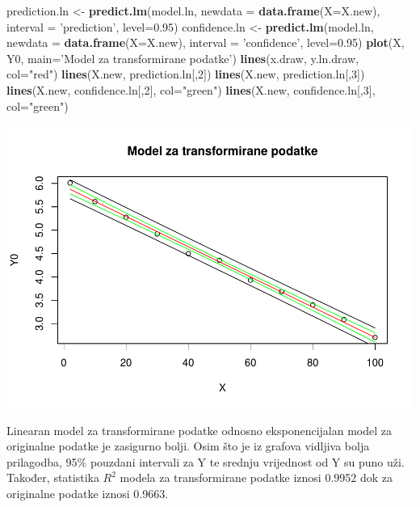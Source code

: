 \documentclass[]{article}
\newenvironment{Shaded}{\begin{snugshade}}{\end{snugshade}}
\newcommand{\KeywordTok}[1]{\textcolor[rgb]{0.13,0.29,0.53}{\textbf{{#1}}}}
\newcommand{\DataTypeTok}[1]{\textcolor[rgb]{0.13,0.29,0.53}{{#1}}}
\newcommand{\DecValTok}[1]{\textcolor[rgb]{0.00,0.00,0.81}{{#1}}}
\newcommand{\FloatTok}[1]{\textcolor[rgb]{0.00,0.00,0.81}{{#1}}}
\newcommand{\StringTok}[1]{\textcolor[rgb]{0.31,0.60,0.02}{{#1}}}
\newcommand{\NormalTok}[1]{{#1}}
\begin{document}
\begin{Shaded}
\begin{Highlighting}[]
\NormalTok{prediction.ln <-}\StringTok{ }\KeywordTok{predict.lm}\NormalTok{(model.ln, }\DataTypeTok{newdata =} \KeywordTok{data.frame}\NormalTok{(}\DataTypeTok{X=}\NormalTok{X.new),}
                            \DataTypeTok{interval =} \StringTok{'prediction'}\NormalTok{, }\DataTypeTok{level=}\FloatTok{0.95}\NormalTok{)}
\NormalTok{confidence.ln <-}\StringTok{ }\KeywordTok{predict.lm}\NormalTok{(model.ln, }\DataTypeTok{newdata =} \KeywordTok{data.frame}\NormalTok{(}\DataTypeTok{X=}\NormalTok{X.new),}
                            \DataTypeTok{interval =} \StringTok{'confidence'}\NormalTok{, }\DataTypeTok{level=}\FloatTok{0.95}\NormalTok{)}
\KeywordTok{plot}\NormalTok{(X, Y0, }\DataTypeTok{main=}\StringTok{'Model za transformirane podatke'}\NormalTok{)}
\KeywordTok{lines}\NormalTok{(x.draw, y.ln.draw, }\DataTypeTok{col=}\StringTok{"red"}\NormalTok{)}
\KeywordTok{lines}\NormalTok{(X.new, prediction.ln[,}\DecValTok{2}\NormalTok{])}
\KeywordTok{lines}\NormalTok{(X.new, prediction.ln[,}\DecValTok{3}\NormalTok{])}
\KeywordTok{lines}\NormalTok{(X.new, confidence.ln[,}\DecValTok{2}\NormalTok{], }\DataTypeTok{col=}\StringTok{"green"}\NormalTok{)}
\KeywordTok{lines}\NormalTok{(X.new, confidence.ln[,}\DecValTok{3}\NormalTok{], }\DataTypeTok{col=}\StringTok{"green"}\NormalTok{)}
\end{Highlighting}
\end{Shaded}

\includegraphics{Izvjestaj_files/figure-latex/unnamed-chunk-16-2.pdf}

Linearan model za transformirane podatke odnosno eksponencijalan model
za originalne podatke je zasigurno bolji. Osim što je iz grafova
vidljiva bolja prilagodba, 95\% pouzdani intervali za Y te srednju
vrijednost od Y su puno uži. Također, statistika \(R^2\) modela za
transformirane podatke iznosi 0.9952 dok za originalne podatke iznosi
0.9663.
\end{document}

